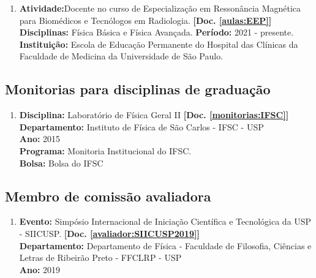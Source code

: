 \documentclass[a4paper,oneside,10pt]{article}
\begin{document}
\begin{enumerate}
        \renewcommand{\labelenumi}{{\large\bfseries\arabic{enumi}.}}

        \item \textbf{Atividade:}Docente no curso de Especialização em Ressonância Magnética para Biomédicos e Tecnólogos em Radiologia. \textbf{[Doc. \ref{aulas:EEP}]}\\
              \textbf{Disciplinas:} Física Básica e Física Avançada.
              \textbf{Período:} 2021 - presente.
              \textbf{Instituição:} Escola de Educação Permanente do Hospital das Clínicas da Faculdade de Medicina da Universidade de São Paulo.

\end{enumerate}

\subsection{Monitorias para disciplinas de graduação}
\vspace{0.3cm}

\begin{enumerate}
\renewcommand{\labelenumi}{{\large\bfseries\arabic{enumi}.}}

\item \textbf{Disciplina:} Laboratório de Física Geral II \textbf{[Doc. \ref{monitorias:IFSC}]}\\
      \textbf{Departamento:} Instituto de Física de São Carlos - IFSC - USP\\
      \textbf{Ano:} 2015\\
      \textbf{Programa:} Monitoria Institucional do IFSC.\\
      \textbf{Bolsa:} Bolsa do IFSC \\

\end{enumerate}


\subsection{Membro de comissão avaliadora}
\vspace{0.3cm}

\begin{enumerate}
\renewcommand{\labelenumi}{{\large\bfseries\arabic{enumi}.}}

\item \textbf{Evento:} Simpósio Internacional de Iniciação Científica e Tecnológica da USP - SIICUSP. \textbf{[Doc. \ref{avaliador:SIICUSP2019}]}\\
      \textbf{Departamento:} Departamento de Física - Faculdade de Filosofia, Ciências e Letras de Ribeirão Preto - FFCLRP - USP\\
      \textbf{Ano:} 2019\\

\end{enumerate}
\end{document}
